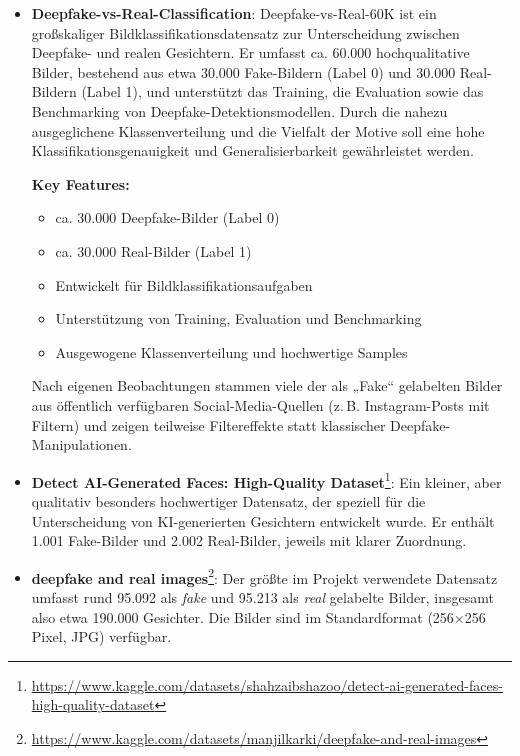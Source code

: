 \begin{itemize}
    \item \textbf{Deepfake-vs-Real-Classification}\cite{prithivmlmods_2025}:  
    Deepfake-vs-Real-60K ist ein großskaliger Bildklassifikationsdatensatz zur Unterscheidung zwischen Deepfake- und realen Gesichtern. Er umfasst ca. 60.000 hochqualitative Bilder, bestehend aus etwa 30.000 Fake-Bildern (Label 0) und 30.000 Real-Bildern (Label 1), und unterstützt das Training, die Evaluation sowie das Benchmarking von Deepfake-Detektionsmodellen. Durch die nahezu ausgeglichene Klassenverteilung und die Vielfalt der Motive soll eine hohe Klassifikationsgenauigkeit und Generalisierbarkeit gewährleistet werden.
    
    \textbf{Key Features:}
    \begin{itemize}
        \item ca. 30.000 Deepfake-Bilder (Label 0)
        \item ca. 30.000 Real-Bilder (Label 1)
        \item Entwickelt für Bildklassifikationsaufgaben
        \item Unterstützung von Training, Evaluation und Benchmarking
        \item Ausgewogene Klassenverteilung und hochwertige Samples
    \end{itemize}
    
    Nach eigenen Beobachtungen stammen viele der als „Fake“ gelabelten Bilder aus öffentlich verfügbaren Social-Media-Quellen (z.\,B. Instagram-Posts mit Filtern) und zeigen teilweise Filtereffekte statt klassischer Deepfake-Manipulationen.

    \item \textbf{Detect AI-Generated Faces: High-Quality Dataset}\footnote{\url{https://www.kaggle.com/datasets/shahzaibshazoo/detect-ai-generated-faces-high-quality-dataset}}:  
    Ein kleiner, aber qualitativ besonders hochwertiger Datensatz, der speziell für die Unterscheidung von KI-generierten Gesichtern entwickelt wurde. Er enthält 1.001 Fake-Bilder und 2.002 Real-Bilder, jeweils mit klarer Zuordnung.

    \item \textbf{deepfake and real images}\footnote{\url{https://www.kaggle.com/datasets/manjilkarki/deepfake-and-real-images}}:  
    Der größte im Projekt verwendete Datensatz umfasst rund 95.092 als \emph{fake} und 95.213 als \emph{real} gelabelte Bilder, insgesamt also etwa 190.000 Gesichter. Die Bilder sind im Standardformat (256×256 Pixel, JPG) verfügbar.
\end{itemize}


